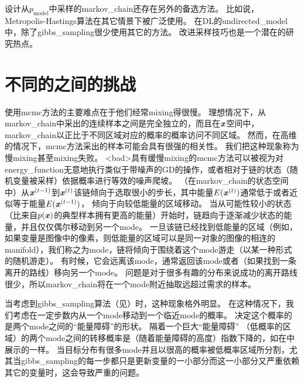 设计从$p_{\text{model}}$中采样的\gls{markov_chain}还存在另外的备选方法。
比如说，Metropolis-Hastings算法在其它情景下被广泛使用。
在\gls{DL}的\gls{undirected_model}中，除了\gls{gibbs_sampling}很少使用其它的方法。
改进采样技巧也是一个潜在的研究热点。


\section{不同的之间的挑战}
\label{sec:the_challenge_of_mixing_between_separated_modes}

使用\gls{mcmc}方法的主要难点在于他们经常\gls{mixing}得很慢。
理想情况下，从\gls{markov_chain}中采出的连续样本之间是完全独立的，而且在$\boldsymbol{\mathit{x}}$空间中，\gls{markov_chain}以正比于不同区域对应的概率的概率访问不同区域。
然而，在高维的情况下，\gls{mcmc}方法采出的样本可能会具有很强的相关性。
我们把这种现象称为慢\gls{mixing}甚至\gls{mixing}失败。
<bad>具有缓慢\gls{mixing}的\gls{mcmc}方法可以被视为对\gls{energy_function}无意地执行类似于带噪声的\gls{GD}的操作，或者相对于链的状态（随机变量被采样）依据概率进行等效的噪声爬坡。
（在\gls{markov_chain}的状态空间中）从$\boldsymbol{\mathit{x}}^{(t-1)}$到$\boldsymbol{\mathit{x}}^{(t)}$该链倾向于选取很小的步长，其中能量$E(\boldsymbol{\mathit{x}}^{(t)})$通常低于或者近似等于能量$E(\boldsymbol{\mathit{x}}^{(t-1)})$，
倾向于向较低能量的区域移动。
当从可能性较小的状态（比来自$p(\boldsymbol{\mathit{x}})$的典型样本拥有更高的能量）开始时，链趋向于逐渐减少状态的能量，并且仅仅偶尔移动到另一个\gls{mode}。
一旦该链已经找到低能量的区域（例如，如果变量是图像中的像素，则低能量的区域可以是同一对象的图像的相连的\gls{manifold}），我们称之为\gls{mode}，链将倾向于围绕着这个\gls{mode}游走（以某一种形式的随机游走）。
有时候，它会远离该\gls{mode}，通常返回该\gls{mode}或者（如果找到一条离开的路线）移向另一个\gls{mode}。
问题是对于很多有趣的分布来说成功的离开路线很少，所以\gls{markov_chain}将在一个\gls{mode}附近抽取远超过需求的样本。


当考虑到\gls{gibbs_sampling}算法（见）时，这种现象格外明显。
在这种情况下，我们考虑在一定步数内从一个\gls{mode}移动到一个临近\gls{mode}的概率。
决定这个概率的是两个\gls{mode}之间的``能量障碍''的形状。
隔着一个巨大``能量障碍'' （低概率的区域）的两个\gls{mode}之间的转移概率是（随着能量障碍的高度）指数下降的，如在中展示的一样。
当目标分布有很多\gls{mode}并且以很高的概率被低概率区域所分割，尤其当\gls{gibbs_sampling}的每一步都只是更新变量的一小部分而这一小部分又严重依赖其它的变量时，这会导致严重的问题。


